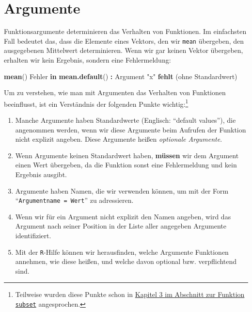 \documentclass[12pt,]{tufte-book}
\newenvironment{Shaded}{\begin{snugshade}}{\end{snugshade}}
\newcommand{\KeywordTok}[1]{\textcolor[rgb]{0.13,0.29,0.53}{\textbf{#1}}}
\newcommand{\StringTok}[1]{\textcolor[rgb]{0.31,0.60,0.02}{#1}}
\newcommand{\ControlFlowTok}[1]{\textcolor[rgb]{0.13,0.29,0.53}{\textbf{#1}}}
\newcommand{\OperatorTok}[1]{\textcolor[rgb]{0.81,0.36,0.00}{\textbf{#1}}}
\newcommand{\NormalTok}[1]{#1}
\providecommand{\tightlist}{%
  \setlength{\itemsep}{0pt}\setlength{\parskip}{0pt}}
\theoremstyle{definition}
\theoremstyle{definition}
\theoremstyle{definition}
\theoremstyle{remark}
\begin{document}
\section{Argumente}\label{argumente}

Funktionsargumente determinieren das Verhalten von Funktionen. Im
einfachsten Fall bedeutet das, dass die Elemente eines Vektors, den wir
\texttt{mean} übergeben, den ausgegebenen Mittelwert determinieren. Wenn
wir gar keinen Vektor übergeben, erhalten wir kein Ergebnis, sondern
eine Fehlermeldung:

\begin{Shaded}
\begin{Highlighting}[]
\KeywordTok{mean}\NormalTok{()}
\NormalTok{Fehler }\ControlFlowTok{in} \KeywordTok{mean.default}\NormalTok{() }\OperatorTok{:}\StringTok{ }\NormalTok{Argument }\StringTok{"x"} \KeywordTok{fehlt}\NormalTok{ (ohne}
\NormalTok{Standardwert)}
\end{Highlighting}
\end{Shaded}

Um zu verstehen, wie man mit Argumenten das Verhalten von Funktionen
beeinflusst, ist ein Verständnis der folgenden Punkte wichtig:\footnote{Teilweise
  wurden diese Punkte schon in \protect\hyperlink{subset}{Kapitel 3 im
  Abschnitt zur Funktion \texttt{subset}} angesprochen.}

\begin{enumerate}
\def\labelenumi{\arabic{enumi}.}
\tightlist
\item
  Manche Argumente haben Standardwerte (Englisch: ``default values''),
  die angenommen werden, wenn wir diese Argumente beim Aufrufen der
  Funktion nicht explizit angeben. Diese Argumente heißen
  \emph{optionale Argumente}.
\item
  Wenn Argumente keinen Standardwert haben, \textbf{müssen} wir dem
  Argument einen Wert übergeben, da die Funktion sonst eine
  Fehlermeldung und kein Ergebnis ausgibt.
\item
  Argumente haben Namen, die wir verwenden können, um mit der Form
  ``\texttt{Argumentname\ =\ Wert}'' zu adressieren.
\item
  Wenn wir für ein Argument nicht explizit den Namen angeben, wird das
  Argument nach seiner Position in der Liste aller angegeben Argumente
  identifiziert.
\item
  Mit der \texttt{R}-Hilfe können wir herausfinden, welche Argumente
  Funktionen annehmen, wie diese heißen, und welche davon optional bzw.
  verpflichtend sind.
\end{enumerate}
\end{document}
